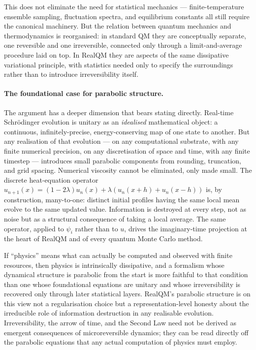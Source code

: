 \documentclass[11pt]{article}
\begin{document}
This does not eliminate the need for statistical mechanics --- finite-temperature ensemble sampling, fluctuation spectra, and equilibrium constants all still require the canonical machinery. But the relation between quantum mechanics and thermodynamics is reorganised: in standard QM they are conceptually separate, one reversible and one irreversible, connected only through a limit-and-average procedure laid on top. In RealQM they are aspects of the same dissipative variational principle, with statistics needed only to specify the surroundings rather than to introduce irreversibility itself.

\paragraph{The foundational case for parabolic structure.}
The argument has a deeper dimension that bears stating directly. Real-time Schr\"odinger evolution is unitary as an \emph{idealised} mathematical object: a continuous, infinitely-precise, energy-conserving map of one state to another. But any realisation of that evolution --- on any computational substrate, with any finite numerical precision, on any discretisation of space and time, with any finite timestep --- introduces small parabolic components from rounding, truncation, and grid spacing. Numerical viscosity cannot be eliminated, only made small. The discrete heat-equation operator $u_{n+1}(x) = (1-2\lambda) u_n(x) + \lambda(u_n(x+h)+u_n(x-h))$ is, by construction, many-to-one: distinct initial profiles having the same local mean evolve to the same updated value. Information is destroyed at every step, not as noise but as a structural consequence of taking a local average. The same operator, applied to $\psi_i$ rather than to $u$, drives the imaginary-time projection at the heart of RealQM and of every quantum Monte Carlo method.

If ``physics'' means what can actually be computed and observed with finite resources, then physics is intrinsically dissipative, and a formalism whose dynamical structure is parabolic from the start is more faithful to that condition than one whose foundational equations are unitary and whose irreversibility is recovered only through later statistical layers. RealQM's parabolic structure is on this view not a regularisation choice but a representation-level honesty about the irreducible role of information destruction in any realisable evolution. Irreversibility, the arrow of time, and the Second Law need not be derived as emergent consequences of microreversible dynamics; they can be read directly off the parabolic equations that any actual computation of physics must employ.
\end{document}
